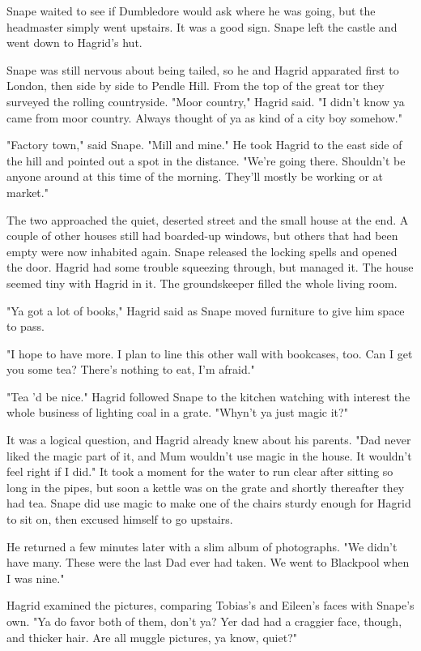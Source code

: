 Snape waited to see if Dumbledore would ask where he was going, but the headmaster simply went upstairs. It was a good sign. Snape left the castle and went down to Hagrid's hut.

Snape was still nervous about being tailed, so he and Hagrid apparated first to London, then side by side to Pendle Hill. From the top of the great tor they surveyed the rolling countryside. "Moor country," Hagrid said. "I didn't know ya came from moor country. Always thought of ya as kind of a city boy somehow."

"Factory town," said Snape. "Mill and mine." He took Hagrid to the east side of the hill and pointed out a spot in the distance. "We're going there. Shouldn't be anyone around at this time of the morning. They'll mostly be working or at market."

The two approached the quiet, deserted street and the small house at the end. A couple of other houses still had boarded-up windows, but others that had been empty were now inhabited again. Snape released the locking spells and opened the door. Hagrid had some trouble squeezing through, but managed it. The house seemed tiny with Hagrid in it. The groundskeeper filled the whole living room.

"Ya got a lot of books," Hagrid said as Snape moved furniture to give him space to pass.

"I hope to have more. I plan to line this other wall with bookcases, too. Can I get you some tea? There's nothing to eat, I'm afraid."

"Tea 'd be nice." Hagrid followed Snape to the kitchen watching with interest the whole business of lighting coal in a grate. "Whyn't ya just magic it?"

It was a logical question, and Hagrid already knew about his parents. "Dad never liked the magic part of it, and Mum wouldn't use magic in the house. It wouldn't feel right if I did." It took a moment for the water to run clear after sitting so long in the pipes, but soon a kettle was on the grate and shortly thereafter they had tea. Snape did use magic to make one of the chairs sturdy enough for Hagrid to sit on, then excused himself to go upstairs.

He returned a few minutes later with a slim album of photographs. "We didn't have many. These were the last Dad ever had taken. We went to Blackpool when I was nine."

Hagrid examined the pictures, comparing Tobias's and Eileen's faces with Snape's own. "Ya do favor both of them, don't ya? Yer dad had a craggier face, though, and thicker hair. Are all muggle pictures, ya know, quiet?"

